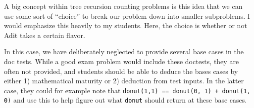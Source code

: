 \begin{questionmeta}
A big concept within tree recursion counting problems is this idea that we can use some sort of ``choice'' to break our problem down into smaller subproblems. I would emphasize this heavily to my students. Here, the choice is whether or not Adit takes a certain flavor. 

In this case, we have deliberately neglected to provide several base cases in the doc tests. While a good exam problem would include these doctests, they are often not provided, and students should be able to deduce the bases cases by either 1) mathematical maturity or 2) deduction from test inputs. In the latter case, they could for example note that \lstinline{donut(1,1) == donut(0, 1) + donut(1, 0)} and use this to help figure out what \lstinline{donut} should return at these base cases. 

\end{questionmeta}